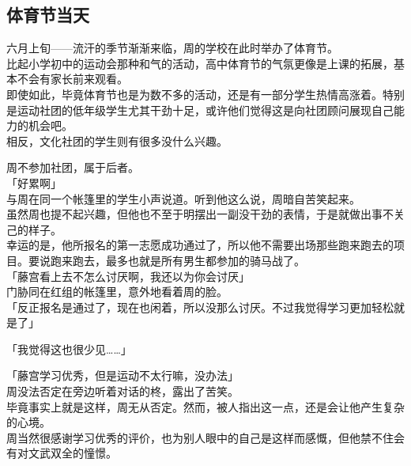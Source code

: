 \subsection{体育节当天}

六月上旬——流汗的季节渐渐来临，周的学校在此时举办了体育节。\\

比起小学初中的运动会那种和气的活动，高中体育节的气氛更像是上课的拓展，基本不会有家长前来观看。\\

即使如此，毕竟体育节也是为数不多的活动，还是有一部分学生热情高涨着。特别是运动社团的低年级学生尤其干劲十足，或许他们觉得这是向社团顾问展现自己能力的机会吧。\\

相反，文化社团的学生则有很多没什么兴趣。

周不参加社团，属于后者。\\

「好累啊」\\

与周在同一个帐篷里的学生小声说道。听到他这么说，周暗自苦笑起来。\\

虽然周也提不起兴趣，但他也不至于明摆出一副没干劲的表情，于是就做出事不关己的样子。\\

幸运的是，他所报名的第一志愿成功通过了，所以他不需要出场那些跑来跑去的项目。要说跑来跑去，最多也就是所有男生都参加的骑马战了。\\

「藤宫看上去不怎么讨厌啊，我还以为你会讨厌」\\

门胁同在红组的帐篷里，意外地看着周的脸。\\

「反正报名是通过了，现在也闲着，所以没那么讨厌。不过我觉得学习更加轻松就是了」

「我觉得这也很少见……」

「藤宫学习优秀，但是运动不太行嘛，没办法」\\

周没法否定在旁边听着对话的柊，露出了苦笑。\\

毕竟事实上就是这样，周无从否定。然而，被人指出这一点，还是会让他产生复杂的心境。\\

周当然很感谢学习优秀的评价，也为别人眼中的自己是这样而感慨，但他禁不住会有对文武双全的憧憬。\\

